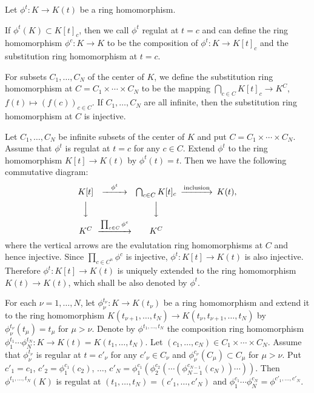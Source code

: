 \documentclass[12pt,a4paper]{article}
\theoremstyle{plain} %
\theoremstyle{definition} %
\theoremstyle{definition} %
\numberwithin{theorem}{section}
\numberwithin{equation}{section}
\numberwithin{figure}{section}
\numberwithin{table}{section}
\begin{document}
Let $\phi^t:K\to K(t)$ be a ring homomorphism.

If $\phi^t(K)\subset K[t]_c$, 
then we call $\phi^t$ regulat at $t=c$ and 
can define the ring homomorphism $\phi^c:K\to K$ to be 
the composition of $\phi^t:K\to K[t]_c$ and 
the substitution ring homomorphism at $t=c$.

For subsets $C_1,\ldots,C_N$ of the center of $K$, 
we define the substitution ring homomorphism at $C=C_1\times\cdots\times C_N$
to be the mapping $\bigcap_{c\in C} K[t]_c\to K^C$, $f(t)\mapsto (f(c))_{c\in C}$.
If $C_1,\ldots,C_N$ are all infinite, then 
the substitution ring homomorphism at $C$ is injective.

Let $C_1,\ldots,C_N$ be infinite subsets of the center of $K$
and put $C=C_1\times\cdots\times C_N$.
Assume that $\phi^t$ is regulat at $t=c$ for any $c\in C$.
Extend $\phi^t$ to the ring homomorphism $K[t]\to K(t)$ by $\phi^t(t)=t$.
Then we have the following commutative diagram:
\begin{equation*}
 \begin{CD}
   K[t] @>\phi^t>>   \bigcap_{c\in C} K[t]_c @>{\text{inclusion}}>> K(t), \\
   @VVV                          @VVV        \\
   K^C  @>\prod_{c\in C}\phi^c>> K^C
 \end{CD}
\end{equation*}
where the vertical arrows are the evalutation ring homomorphisms at $C$
and hence injective.
Since $\prod_{c\in C^n}\phi^c$ is injective, 
$\phi^t:K[t]\to K(t)$ is also injective.
Therefore $\phi^t:K[t]\to K(t)$ is uniquely extended 
to the ring homomorphism $K(t)\to K(t)$, 
which shall be also denoted by $\phi^t$.

For each $\nu=1,\ldots,N$, 
let $\phi_\nu^{t_\nu}:K\to K(t_\nu)$ be a ring homomorphism 
and extend it to the ring homomorphism 
$K(t_{\nu+1},\ldots,t_N)\to K(t_\nu,t_{\nu+1},\ldots,t_N)$ 
by $\phi_\nu^{t_\nu}(t_\mu)=t_\mu$ for $\mu>\nu$.
Denote by $\phi^{t_1,\ldots,t_N}$ 
the composition ring homomorphism 
$\phi_1^{t_1}\cdots\phi_N^{t_N}:K\to K(t)=K(t_1,\ldots,t_N)$.
Let $(c_1,\ldots,c_N)\in C_1\times\cdots\times C_N$.
Assume that 
$\phi_\nu^{t_\nu}$ is regular at $t=c'_\nu$ for any $c'_\nu\in C_\nu$ 
and $\phi_\nu^{c_\nu}(C_\mu)\subset C_\mu$ for $\mu>\nu$.
Put $c'_1 = c_1$, $c'_2 = \phi_1^{c_1}(c_2)$, $\ldots$,
$c'_N = \phi_1^{c_1}(\phi_2^{c_2}(\cdots(\phi_{N-1}^{c_{N-1}}(c_N))\cdots))$.
Then $\phi^{t_1,\ldots,t_N}(K)$ is 
regulat at $(t_1,\ldots,t_N)=(c'_1,\ldots,c'_N)$ and
$\phi_1^{c_1}\cdots\phi_N^{c_N} = \phi^{c'_1,\ldots,c'_N}$.
\end{document}
